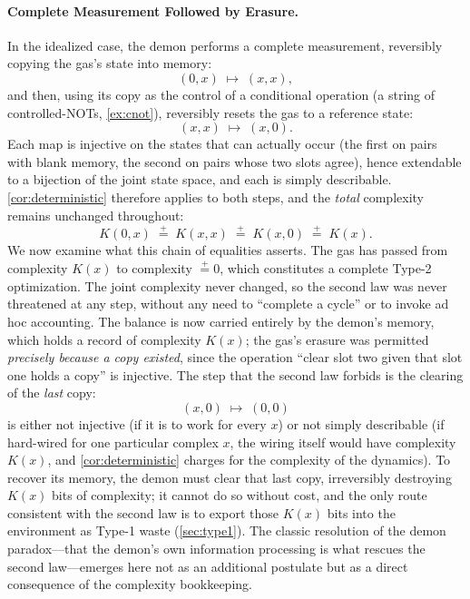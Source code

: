 \documentclass[11pt]{article}
\newcommand{\peq}{\mathrel{\stackrel{+}{=}}}
\begin{document}
\paragraph{Complete Measurement Followed by Erasure.} In the idealized case, the demon performs a complete measurement, reversibly copying the gas's state into memory:
\[
(0, x) \;\mapsto\; (x, x),
\]
and then, using its copy as the control of a conditional operation (a string of controlled-NOTs, \cref{ex:cnot}), reversibly resets the gas to a reference state:
\[
(x, x) \;\mapsto\; (x, 0).
\]
Each map is injective on the states that can actually occur (the first on pairs with blank memory, the second on pairs whose two slots agree), hence extendable to a bijection of the joint state space, and each is simply describable. \cref{cor:deterministic} therefore applies to both steps, and the \emph{total} complexity remains unchanged throughout:
\[
K(0, x) \;\peq\; K(x, x) \;\peq\; K(x, 0) \;\peq\; K(x).
\]
We now examine what this chain of equalities asserts. The gas has passed from complexity $K(x)$ to complexity $\peq 0$, which constitutes a complete Type-2 optimization. The joint complexity never changed, so the second law was never threatened at any step, without any need to ``complete a cycle'' or to invoke ad hoc accounting. The balance is now carried entirely by the demon's memory, which holds a record of complexity $K(x)$; the gas's erasure was permitted \emph{precisely because a copy existed}, since the operation ``clear slot two given that slot one holds a copy'' is injective. The step that the second law forbids is the clearing of the \emph{last} copy:
\[
(x, 0) \;\mapsto\; (0, 0)
\]
is either not injective (if it is to work for every $x$) or not simply describable (if hard-wired for one particular complex $x$, the wiring itself would have complexity $K(x)$, and \cref{cor:deterministic} charges for the complexity of the dynamics). To recover its memory, the demon must clear that last copy, irreversibly destroying $K(x)$ bits of complexity; it cannot do so without cost, and the only route consistent with the second law is to export those $K(x)$ bits into the environment as Type-1 waste (\cref{sec:type1}). The classic resolution of the demon paradox---that the demon's own information processing is what rescues the second law---emerges here not as an additional postulate but as a direct consequence of the complexity bookkeeping.
\end{document}
